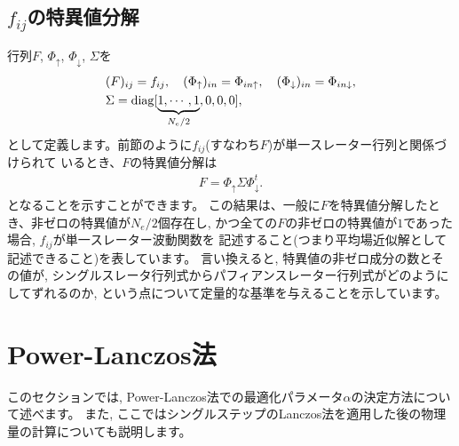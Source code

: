 \subsection{$f_{ij}$の特異値分解}
\label{sec:PfaffianSingular}

行列$F$, $\Phi_{\uparrow}$, $\Phi_{\downarrow}$, $\Sigma$を
\begin{align}
&(F)_{ij}=f_{ij},~~~ 
(\Phi_{\uparrow})_{in}=\Phi_{in\uparrow},~~~ 
(\Phi_{\downarrow})_{in}=\Phi_{in\downarrow}, \\
&\Sigma={\rm diag}[\underbrace{1,\cdots,1}_{N_e/2},0,0,0],
\end{align}
として定義します。前節のように$f_{ij}$(すなわち$F$)が単一スレーター行列と関係づけられて
いるとき、$F$の特異値分解は
\begin{align}
F=\Phi_{\uparrow}\Sigma\Phi_{\downarrow}^{t}.
\end{align}
となることを示すことができます。
この結果は、一般に$F$を特異値分解したとき、非ゼロの特異値が$N_{e}/2$個存在し, 
かつ全ての$F$の非ゼロの特異値が$1$であった場合, $f_{ij}$が単一スレーター波動関数を
記述すること(つまり平均場近似解として記述できること)を表しています。
言い換えると, 特異値の非ゼロ成分の数とその値が, 
シングルスレータ行列式からパフィアンスレーター行列式がどのようにしてずれるのか, 
という点について定量的な基準を与えることを示しています。

\section{Power-Lanczos法}

このセクションでは, Power-Lanczos法での最適化パラメータ$\alpha$の決定方法について述べます。
また, ここではシングルステップのLanczos法を適用した後の物理量の計算についても説明します。


